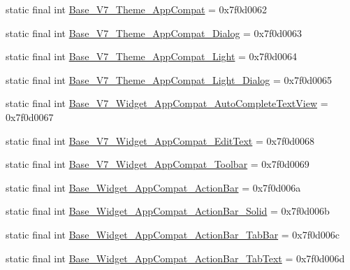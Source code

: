 \begin{DoxyCompactItemize}
\item 
static final int \mbox{\hyperlink{classcom_1_1synnapps_1_1carouselview_1_1_r_1_1style_af97a121344d5d4960adc26364da140dd}{Base\+\_\+\+V7\+\_\+\+Theme\+\_\+\+App\+Compat}} = 0x7f0d0062
\item 
static final int \mbox{\hyperlink{classcom_1_1synnapps_1_1carouselview_1_1_r_1_1style_a2df9b4b44e3973d6aae2491f492f7b94}{Base\+\_\+\+V7\+\_\+\+Theme\+\_\+\+App\+Compat\+\_\+\+Dialog}} = 0x7f0d0063
\item 
static final int \mbox{\hyperlink{classcom_1_1synnapps_1_1carouselview_1_1_r_1_1style_acbc3e138dcc2f77f6de1a7d2ffd66d50}{Base\+\_\+\+V7\+\_\+\+Theme\+\_\+\+App\+Compat\+\_\+\+Light}} = 0x7f0d0064
\item 
static final int \mbox{\hyperlink{classcom_1_1synnapps_1_1carouselview_1_1_r_1_1style_a3b1b9ffdf1786e60ce1ec703a5398b08}{Base\+\_\+\+V7\+\_\+\+Theme\+\_\+\+App\+Compat\+\_\+\+Light\+\_\+\+Dialog}} = 0x7f0d0065
\item 
static final int \mbox{\hyperlink{classcom_1_1synnapps_1_1carouselview_1_1_r_1_1style_a4b8c2f6fda29047a5b4ad3b83f372c4d}{Base\+\_\+\+V7\+\_\+\+Widget\+\_\+\+App\+Compat\+\_\+\+Auto\+Complete\+Text\+View}} = 0x7f0d0067
\item 
static final int \mbox{\hyperlink{classcom_1_1synnapps_1_1carouselview_1_1_r_1_1style_acb9b0b8006d48e2b3220d180f43519c7}{Base\+\_\+\+V7\+\_\+\+Widget\+\_\+\+App\+Compat\+\_\+\+Edit\+Text}} = 0x7f0d0068
\item 
static final int \mbox{\hyperlink{classcom_1_1synnapps_1_1carouselview_1_1_r_1_1style_a014fffa39334b87845c89b65491f3b30}{Base\+\_\+\+V7\+\_\+\+Widget\+\_\+\+App\+Compat\+\_\+\+Toolbar}} = 0x7f0d0069
\item 
static final int \mbox{\hyperlink{classcom_1_1synnapps_1_1carouselview_1_1_r_1_1style_ad8d3d60fdce4ed2fc0c32cc9c46da923}{Base\+\_\+\+Widget\+\_\+\+App\+Compat\+\_\+\+Action\+Bar}} = 0x7f0d006a
\item 
static final int \mbox{\hyperlink{classcom_1_1synnapps_1_1carouselview_1_1_r_1_1style_ac4edc5b357893f715987d37b9bd51e3c}{Base\+\_\+\+Widget\+\_\+\+App\+Compat\+\_\+\+Action\+Bar\+\_\+\+Solid}} = 0x7f0d006b
\item 
static final int \mbox{\hyperlink{classcom_1_1synnapps_1_1carouselview_1_1_r_1_1style_a4308334b3d0498354b73ac9df9d43927}{Base\+\_\+\+Widget\+\_\+\+App\+Compat\+\_\+\+Action\+Bar\+\_\+\+Tab\+Bar}} = 0x7f0d006c
\item 
static final int \mbox{\hyperlink{classcom_1_1synnapps_1_1carouselview_1_1_r_1_1style_ac3399623c03ce9a28b1b44c1ba7eb509}{Base\+\_\+\+Widget\+\_\+\+App\+Compat\+\_\+\+Action\+Bar\+\_\+\+Tab\+Text}} = 0x7f0d006d

\end{DoxyCompactItemize}
